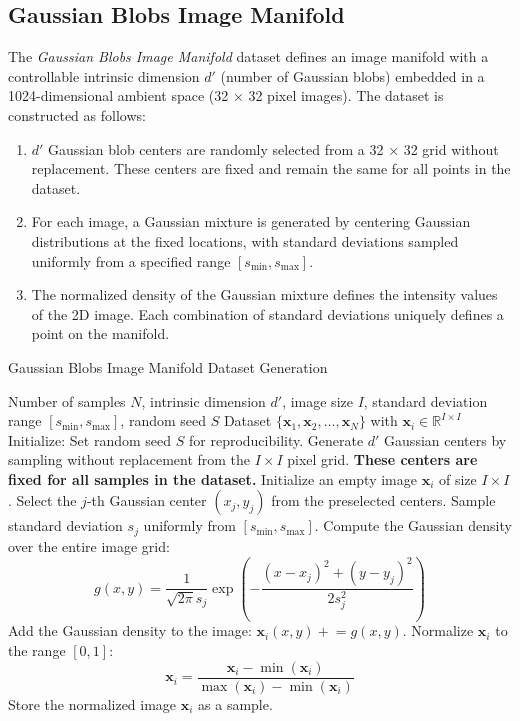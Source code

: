 \subsection{Gaussian Blobs Image Manifold}

The \textit{Gaussian Blobs Image Manifold} dataset defines an image manifold with a controllable intrinsic dimension $d'$ (number of Gaussian blobs) embedded in a 1024-dimensional ambient space (32 × 32 pixel images). The dataset is constructed as follows:
\begin{enumerate}
    \item $d'$ Gaussian blob centers are randomly selected from a 32 × 32 grid without replacement. These centers are fixed and remain the same for all points in the dataset.
    \item For each image, a Gaussian mixture is generated by centering Gaussian distributions at the fixed locations, with standard deviations sampled uniformly from a specified range $[s_{\min}, s_{\max}]$.
    \item The normalized density of the Gaussian mixture defines the intensity values of the 2D image. Each combination of standard deviations uniquely defines a point on the manifold.
\end{enumerate}

\begin{algorithm}[h]
\caption{Gaussian Blobs Image Manifold Dataset Generation}
\label{alg:gaussian_blobs}
\begin{algorithmic}[1]
\REQUIRE Number of samples $N$, intrinsic dimension $d'$, image size $I$, standard deviation range $[s_{\min}, s_{\max}]$, random seed $S$
\ENSURE Dataset $\{\mathbf{x}_1, \mathbf{x}_2, \dots, \mathbf{x}_N\}$ with $\mathbf{x}_i \in \mathbb{R}^{I \times I}$
\STATE Initialize: Set random seed $S$ for reproducibility.
\STATE Generate $d'$ Gaussian centers by sampling without replacement from the $I \times I$ pixel grid. \textbf{These centers are fixed for all samples in the dataset.}
    \STATE Initialize an empty image $\mathbf{x}_i$ of size $I \times I$.
        \STATE Select the $j$-th Gaussian center $(x_j, y_j)$ from the preselected centers.
        \STATE Sample standard deviation $s_j$ uniformly from $[s_{\min}, s_{\max}]$.
        \STATE Compute the Gaussian density over the entire image grid:
        \[
        g(x, y) = \frac{1}{\sqrt{2 \pi} s_j} \exp\left(-\frac{(x - x_j)^2 + (y - y_j)^2}{2 s_j^2}\right)
        \]
        \STATE Add the Gaussian density to the image: $\mathbf{x}_i(x, y) \mathrel{+}= g(x, y)$.
    \ENDFOR
    \STATE Normalize $\mathbf{x}_i$ to the range $[0, 1]$:
    \[
    \mathbf{x}_i = \frac{\mathbf{x}_i - \min(\mathbf{x}_i)}{\max(\mathbf{x}_i) - \min(\mathbf{x}_i)}
    \]
    \STATE Store the normalized image $\mathbf{x}_i$ as a sample.
\ENDFOR
\end{algorithmic}
\end{algorithm}

